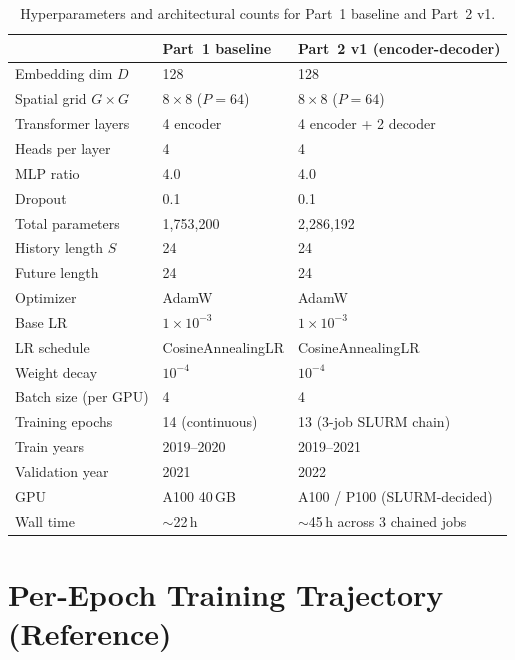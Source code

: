 \documentclass[11pt,letterpaper]{article}
\begin{document}
\begin{table}[!h]
\centering
\small
\caption{Hyperparameters and architectural counts for Part~1 baseline and Part~2 v1.}
\label{tab:hparams}
\begin{tabularx}{\linewidth}{@{}lXX@{}}
\toprule
& \textbf{Part~1 baseline} & \textbf{Part~2 v1 (encoder-decoder)} \\
\midrule
Embedding dim $D$           & 128 & 128 \\
Spatial grid $G\times G$    & $8\times 8$ ($P=64$) & $8\times 8$ ($P=64$) \\
Transformer layers          & 4 encoder & 4 encoder + 2 decoder \\
Heads per layer             & 4         & 4 \\
MLP ratio                   & 4.0       & 4.0 \\
Dropout                     & 0.1       & 0.1 \\
Total parameters            & 1{,}753{,}200 & 2{,}286{,}192 \\
History length $S$          & 24        & 24 \\
Future length               & 24        & 24 \\
Optimizer                   & AdamW \citep{loshchilov2019adamw} & AdamW \\
Base LR                     & $1\!\times\!10^{-3}$ & $1\!\times\!10^{-3}$ \\
LR schedule                 & CosineAnnealingLR \citep{loshchilov2017sgdr} & CosineAnnealingLR \\
Weight decay                & $10^{-4}$ & $10^{-4}$ \\
Batch size (per GPU)        & 4 & 4 \\
Training epochs             & 14 (continuous) & 13 (3-job SLURM chain) \\
Train years                 & 2019--2020 & 2019--2021 \\
Validation year             & 2021      & 2022 \\
GPU                         & A100 40\,GB & A100 / P100 (SLURM-decided) \\
Wall time                   & $\sim$22\,h & $\sim$45\,h across 3 chained jobs \\
\bottomrule
\end{tabularx}
\end{table}

\section{Per-Epoch Training Trajectory (Reference)}
\label{app:traj}
\end{document}
